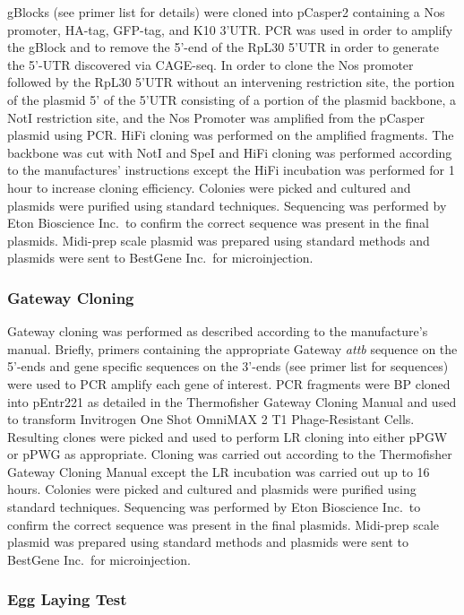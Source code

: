 \documentclass[12pt,oneside]{reedthesis}
\begin{document}
gBlocks (see primer list for details) were cloned into pCasper2 containing a Nos promoter, HA-tag, GFP-tag, and K10 3'UTR. PCR was used in order to amplify the gBlock and to remove the 5'-end of the RpL30 5'UTR in order to generate the 5'-UTR discovered via CAGE-seq. In order to clone the Nos promoter followed by the RpL30 5'UTR without an intervening restriction site, the portion of the plasmid 5' of the 5'UTR consisting of a portion of the plasmid backbone, a NotI restriction site, and the Nos Promoter was amplified from the pCasper plasmid using PCR. HiFi cloning was performed on the amplified fragments. The backbone was cut with NotI and SpeI and HiFi cloning was performed according to the manufactures' instructions except the HiFi incubation was performed for 1 hour to increase cloning efficiency. Colonies were picked and cultured and plasmids were purified using standard techniques. Sequencing was performed by Eton Bioscience Inc.~to confirm the correct sequence was present in the final plasmids. Midi-prep scale plasmid was prepared using standard methods and plasmids were sent to BestGene Inc.~for microinjection.

\hypertarget{gateway-cloning}{%
\subsubsection{Gateway Cloning}\label{gateway-cloning}}

Gateway cloning was performed as described according to the manufacture's manual. Briefly, primers containing the appropriate Gateway \emph{attb} sequence on the 5'-ends and gene specific sequences on the 3'-ends (see primer list for sequences) were used to PCR amplify each gene of interest. PCR fragments were BP cloned into pEntr221 as detailed in the Thermofisher Gateway Cloning Manual and used to transform Invitrogen One Shot OmniMAX 2 T1 Phage-Resistant Cells. Resulting clones were picked and used to perform LR cloning into either pPGW or pPWG as appropriate. Cloning was carried out according to the Thermofisher Gateway Cloning Manual except the LR incubation was carried out up to 16 hours. Colonies were picked and cultured and plasmids were purified using standard techniques. Sequencing was performed by Eton Bioscience Inc.~to confirm the correct sequence was present in the final plasmids. Midi-prep scale plasmid was prepared using standard methods and plasmids were sent to BestGene Inc.~for microinjection.

\hypertarget{egg-laying-test}{%
\subsubsection{Egg Laying Test}\label{egg-laying-test}}
\end{document}

